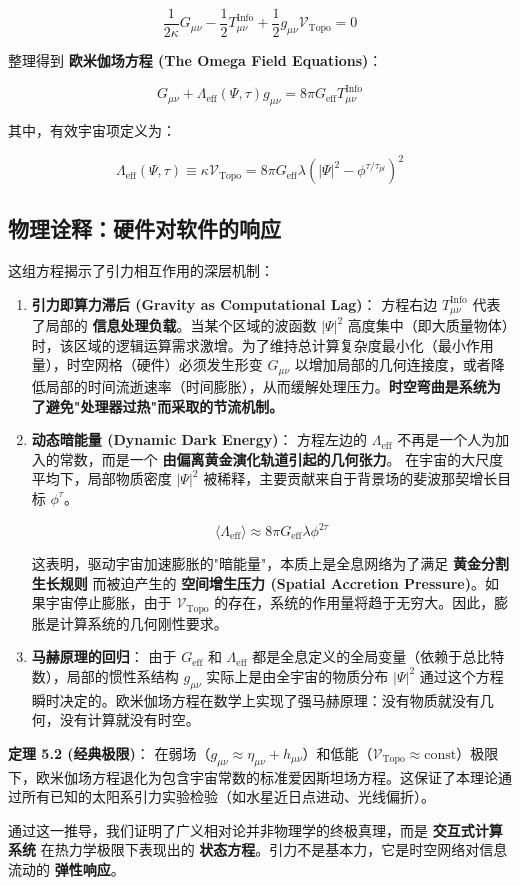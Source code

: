 \[\frac{1}{2\kappa} G_{\mu\nu} - \frac{1}{2} T_{\mu\nu}^{\text{Info}} + \frac{1}{2} g_{\mu\nu} \mathcal{V}_{\text{Topo}} = 0\]

整理得到 \textbf{欧米伽场方程 (The Omega Field Equations)}：

\[G_{\mu\nu} + \Lambda_{\text{eff}}(\Psi, \tau) g_{\mu\nu} = 8\pi G_{\text{eff}} T_{\mu\nu}^{\text{Info}}\]

其中，有效宇宙项定义为：

\[\Lambda_{\text{eff}}(\Psi, \tau) \equiv \kappa \mathcal{V}_{\text{Topo}} = 8\pi G_{\text{eff}} \lambda \left( |\Psi|^2 - \phi^{\tau/\tau_{pl}} \right)^2\]

\subsection{物理诠释：硬件对软件的响应}

这组方程揭示了引力相互作用的深层机制：

\begin{enumerate}
\item \textbf{引力即算力滞后 (Gravity as Computational Lag)}：
   方程右边 $T_{\mu\nu}^{\text{Info}}$ 代表了局部的 \textbf{信息处理负载}。当某个区域的波函数 $|\Psi|^2$ 高度集中（即大质量物体）时，该区域的逻辑运算需求激增。为了维持总计算复杂度最小化（最小作用量），时空网格（硬件）必须发生形变 $G_{\mu\nu}$ 以增加局部的几何连接度，或者降低局部的时间流逝速率（时间膨胀），从而缓解处理压力。\textbf{时空弯曲是系统为了避免"处理器过热"而采取的节流机制。}

\item \textbf{动态暗能量 (Dynamic Dark Energy)}：
   方程左边的 $\Lambda_{\text{eff}}$ 不再是一个人为加入的常数，而是一个 \textbf{由偏离黄金演化轨道引起的几何张力}。
   在宇宙的大尺度平均下，局部物质密度 $|\Psi|^2$ 被稀释，主要贡献来自于背景场的斐波那契增长目标 $\phi^{\tau}$。

\[\langle \Lambda_{\text{eff}} \rangle \approx 8\pi G_{\text{eff}} \lambda \phi^{2\tau}\]

这表明，驱动宇宙加速膨胀的"暗能量"，本质上是全息网络为了满足 \textbf{黄金分割生长规则} 而被迫产生的 \textbf{空间增生压力 (Spatial Accretion Pressure)}。如果宇宙停止膨胀，由于 $\mathcal{V}_{\text{Topo}}$ 的存在，系统的作用量将趋于无穷大。因此，膨胀是计算系统的几何刚性要求。

\item \textbf{马赫原理的回归}：
   由于 $G_{\text{eff}}$ 和 $\Lambda_{\text{eff}}$ 都是全息定义的全局变量（依赖于总比特数），局部的惯性系结构 $g_{\mu\nu}$ 实际上是由全宇宙的物质分布 $|\Psi|^2$ 通过这个方程瞬时决定的。欧米伽场方程在数学上实现了强马赫原理：没有物质就没有几何，没有计算就没有时空。
\end{enumerate}

\textbf{定理 5.2 (经典极限)}：
在弱场（$g_{\mu\nu} \approx \eta_{\mu\nu} + h_{\mu\nu}$）和低能（$\mathcal{V}_{\text{Topo}} \approx \text{const}$）极限下，欧米伽场方程退化为包含宇宙常数的标准爱因斯坦场方程。这保证了本理论通过所有已知的太阳系引力实验检验（如水星近日点进动、光线偏折）。

通过这一推导，我们证明了广义相对论并非物理学的终极真理，而是 \textbf{交互式计算系统} 在热力学极限下表现出的 \textbf{状态方程}。引力不是基本力，它是时空网络对信息流动的 \textbf{弹性响应}。
